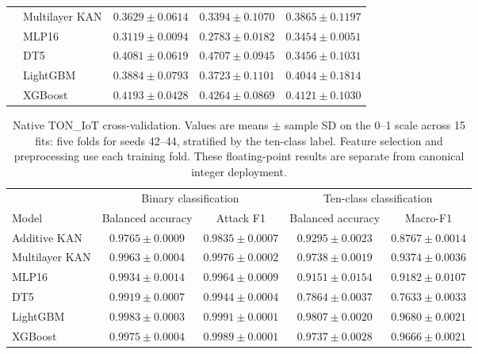 \begin{table}[p]
\begin{tabular}{llccc}
 & Multilayer KAN & $0.3629 \pm 0.0614$ & $0.3394 \pm 0.1070$ & $0.3865 \pm 0.1197$ \\
 & MLP16 & $0.3119 \pm 0.0094$ & $0.2783 \pm 0.0182$ & $0.3454 \pm 0.0051$ \\
 & DT5 & $0.4081 \pm 0.0619$ & $0.4707 \pm 0.0945$ & $0.3456 \pm 0.1031$ \\
 & LightGBM & $0.3884 \pm 0.0793$ & $0.3723 \pm 0.1101$ & $0.4044 \pm 0.1814$ \\
 & XGBoost & $0.4193 \pm 0.0428$ & $0.4264 \pm 0.0869$ & $0.4121 \pm 0.1030$ \\
\bottomrule
\end{tabular}
\end{table}

\begin{table}[p]
\centering
\caption{Native TON\_IoT cross-validation. Values are means $\pm$ sample SD on the 0--1 scale across 15 fits: five folds for seeds 42--44, stratified by the ten-class label. Feature selection and preprocessing use each training fold. These floating-point results are separate from canonical integer deployment.}
\label{tab:supp-native-cv}
\footnotesize
\setlength{\tabcolsep}{6pt}
\begin{tabular}{lcccc}
\toprule
& \multicolumn{2}{c}{Binary classification} & \multicolumn{2}{c}{Ten-class classification} \\
\cmidrule(lr){2-3}\cmidrule(lr){4-5}
Model & Balanced accuracy & Attack F1 & Balanced accuracy & Macro-F1 \\
\midrule
Additive KAN & $0.9765 \pm 0.0009$ & $0.9835 \pm 0.0007$ & $0.9295 \pm 0.0023$ & $0.8767 \pm 0.0014$ \\
Multilayer KAN & $0.9963 \pm 0.0004$ & $0.9976 \pm 0.0002$ & $0.9738 \pm 0.0019$ & $0.9374 \pm 0.0036$ \\
MLP16 & $0.9934 \pm 0.0014$ & $0.9964 \pm 0.0009$ & $0.9151 \pm 0.0154$ & $0.9182 \pm 0.0107$ \\
DT5 & $0.9919 \pm 0.0007$ & $0.9944 \pm 0.0004$ & $0.7864 \pm 0.0037$ & $0.7633 \pm 0.0033$ \\
LightGBM & $0.9983 \pm 0.0003$ & $0.9991 \pm 0.0001$ & $0.9807 \pm 0.0020$ & $0.9680 \pm 0.0021$ \\
XGBoost & $0.9975 \pm 0.0004$ & $0.9989 \pm 0.0001$ & $0.9737 \pm 0.0028$ & $0.9666 \pm 0.0021$ \\
\bottomrule
\end{tabular}
\end{table}

